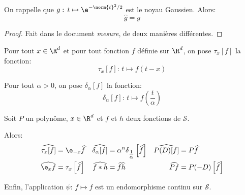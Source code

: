 \begin{prop}
On rappelle que $g: \, t \mapsto \e^{-\norm{t}^2/2}$ est le noyau Gaussien. Alors:
\[
\widehat{g} = g
\]
\end{prop}

\begin{proof}
Fait dans le document \emph{mesure}, de deux manières différentes.
\end{proof}



\begin{de}
Pour tout $x \in \R^d$ et pour tout fonction $f$ définie sur $\R^d$, on pose $\tau_x[f]$ la fonction:
\[
\tau_x[f]: \, t \mapsto f(t-x)
\]

Pour tout $\alpha > 0$, on pose $\delta_{\alpha}[f]$ la fonction:
\[
\delta_{\alpha}[f]: \, t \mapsto f\left (\frac{t}{\alpha}\right )
\]
\end{de}


\begin{prop}
Soit $P$ un polynôme, $x \in \R^d$ et $f$ et $h$ deux fonctions de $\mathcal{S}$.

Alors:
\begin{align*}
\widehat{\tau_x[f]} & = \e_{-x} \widehat{f} & 
\widehat{\delta_{\alpha}[f]} & = \alpha^n \delta_{\tfrac{1}{\alpha}} \left [\widehat{f}\right ] &
\widehat{P(D)[f]} & = P \widehat{f} \\
\widehat{\e_x f} & = \tau_x\left [ \widehat{f}\right ] &
\widehat{f*h} & = \widehat{f} \widehat{h} &
\widehat{Pf} & = P(-D)\left [\widehat{f} \right ] 
\end{align*}

Enfin, l'application $\psi: \, f \mapsto \widehat{f}$ est un endomorphisme continu sur $\mathcal{S}$.
\end{prop}

